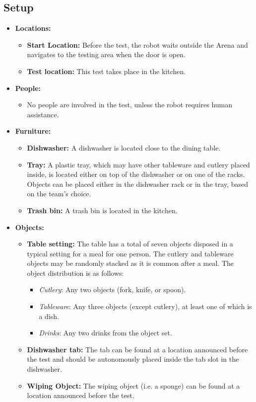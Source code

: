 \subsection*{Setup}
\begin{itemize}[nosep]
	\item \textbf{Locations:}
		\begin{itemize}
			\item \textbf{Start Location:} Before the test, the robot waits outside the Arena and navigates to the testing area when the door is open.
			\item \textbf{Test location:} This test takes place in the kitchen.
		\end{itemize}
	\item \textbf{People:}
		\begin{itemize}
			\item No people are involved in the test, unless the robot requires human assistance.
		\end{itemize}
	\item \textbf{Furniture:}
		\begin{itemize}
			\item \textbf{Dishwasher:} A dishwasher is located close to the dining table.
			\item \textbf{Tray:} A plastic tray, which may have other tableware and cutlery placed inside, is located either on top of the dishwasher or on one of the racks. Objects can be placed either in the dishwasher rack or in the tray, based on the team's choice.
			\item \textbf{Trash bin:} A trash bin is located in the kitchen.
		\end{itemize}
	\item \textbf{Objects:}
		\begin{itemize}
			\item \textbf{Table setting:} The table has a total of seven objects disposed in a typical setting for a meal for one person. The cutlery and tableware objects may be randomly stacked as it is common after a meal. 
			The object distribution is as follows:
			\begin{itemize}[nosep]
				\item\textit{Cutlery}: Any two objects (fork, knife, or spoon).
				\item\textit{Tableware}: Any three objects (except cutlery), at least one of which is a dish.
				\item\textit{Drinks}: Any two drinks from the object set.
			\end{itemize}
			\item \textbf{Dishwasher tab:} The tab can be found at a location announced before the test and should be autonomously placed inside the tab slot in the dishwasher.
			\item \textbf{Wiping Object:} The wiping object (i.e. a sponge) can be found at a location announced before the test.
		\end{itemize}
\end{itemize}


